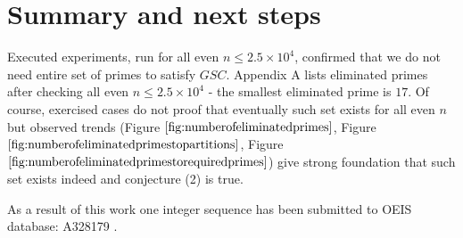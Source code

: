 \documentclass[10pt,twocolumn]{article}
\begin{document}
\section{Summary and next steps}

Executed experiments, run for all even $n \leq 2.5 \times 10^4$, confirmed that we do not need entire set of primes to satisfy $GSC$. Appendix A lists eliminated primes after checking all even $n \leq 2.5 \times 10^4$ - the smallest eliminated prime is $17$. Of course, exercised cases do not proof that eventually such set exists for all even $n$ but observed trends (Figure $\ref{fig:numberofeliminatedprimes}$, Figure $\ref{fig:numberofeliminatedprimestopartitions}$,  Figure $\ref{fig:numberofeliminatedprimestorequiredprimes}$) give strong foundation that such set exists indeed and conjecture (2) is true. \par
As a result of this work one integer sequence has been submitted to OEIS database: A328179 \cite{A328179}. 
\end{document}
